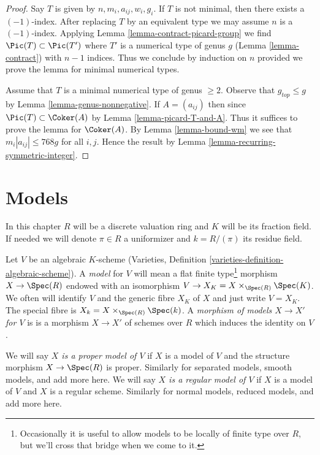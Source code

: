 \begin{proof}
Say $T$ is given by $n, m_i, a_{ij}, w_i, g_i$.
If $T$ is not minimal, then there exists a $(-1)$-index.
After replacing $T$ by an equivalent type we may assume
$n$ is a $(-1)$-index. Applying Lemma \ref{lemma-contract-picard-group}
we find $\Pic(T) \subset \Pic(T')$ where $T'$
is a numerical type of genus $g$ (Lemma \ref{lemma-contract})
with $n - 1$ indices. Thus we conclude by induction on $n$
provided we prove the lemma for minimal numerical types.

\medskip\noindent
Assume that $T$ is a minimal numerical type of genus $\geq 2$.
Observe that $g_{top} \leq g$ by Lemma \ref{lemma-genus-nonnegative}.
If $A = (a_{ij})$ then since $\Pic(T) \subset \Coker(A)$
by Lemma \ref{lemma-picard-T-and-A}. Thus it suffices to prove
the lemma for $\Coker(A)$.
By Lemma \ref{lemma-bound-wm} we see that $m_i|a_{ij}| \leq 768g$ for
all $i, j$.
Hence the result by Lemma \ref{lemma-recurring-symmetric-integer}.
\end{proof}







\section{Models}
\label{section-models}

\noindent
In this chapter $R$ will be a discrete valuation ring and $K$ will
be its fraction field. If needed we will denote $\pi \in R$ a
uniformizer and $k = R/(\pi)$ its residue field.

\medskip\noindent
Let $V$ be an algebraic $K$-scheme
(Varieties, Definition \ref{varieties-definition-algebraic-scheme}).
A {\it model} for $V$ will
mean a flat finite type\footnote{Occasionally it is useful to
allow models to be locally of finite type over $R$, but we'll
cross that bridge when we come to it.}
morphism $X \to \Spec(R)$ endowed with
an isomorphism $V \to X_K = X \times_{\Spec(R)} \Spec(K)$. We often
will identify $V$ and the generic fibre $X_K$ of $X$ and
just write $V = X_K$.
The special fibre is $X_k = X \times_{\Spec(R)} \Spec(k)$.
A {\it morphism of models $X \to X'$ for $V$} is
is a morphism $X \to X'$ of schemes over $R$ which induces
the identity on $V$.

\medskip\noindent
We will say {\it $X$ is a proper model of $V$} if $X$ is a model
of $V$ and the structure morphism $X \to \Spec(R)$ is proper.
Similarly for separated models, smooth models, and add more here.
We will say {\it $X$ is a regular model of $V$} if $X$ is a model
of $V$ and $X$ is a regular scheme.
Similarly for normal models, reduced models, and add more here.

